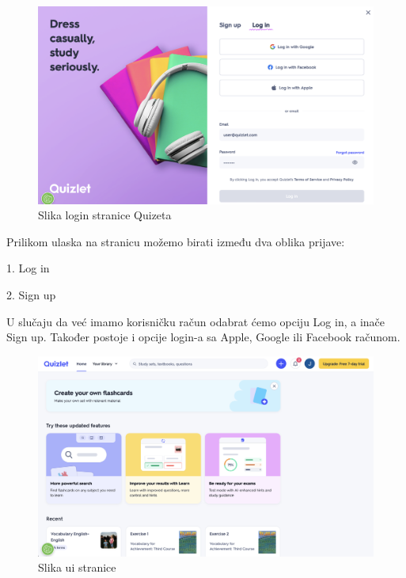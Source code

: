 \begin{figure}[H]
	\includegraphics[width=\textwidth]{SlikeOpisProjekta/login_screen_quizlet.png} %
	\caption{Slika login stranice Quizeta}
	\label{fig:LoginScreenQuizlet} %
\end{figure}

Prilikom ulaska na stranicu možemo birati između dva oblika prijave:
\begin{packed_item}
\item 1. Log in
\item 2. Sign up
\end{packed_item}

U slučaju da već imamo korisničku račun odabrat ćemo opciju Log in, a inače Sign up. Također postoje i opcije login-a sa Apple, Google ili Facebook računom. 

\begin{figure}[H]
	\includegraphics[width=\textwidth]{SlikeOpisProjekta/user_interface_quizlet.png} %
	\caption{Slika ui stranice}
	\label{fig:UserInterfaceQuizlet} %
\end{figure}


